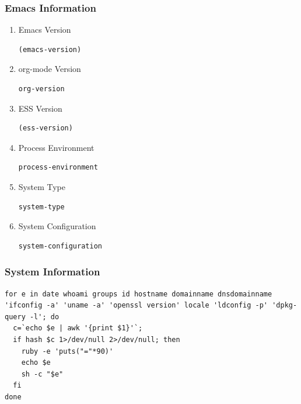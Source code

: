 \documentclass[11pt]{article}
\begin{document}
\subsubsection{Emacs Information}
\label{sec-9-2-4}

\begin{enumerate}
\item Emacs Version
\label{sec-9-2-4-1}

\begin{verbatim}
(emacs-version)
\end{verbatim}

\item org-mode Version
\label{sec-9-2-4-2}

\begin{verbatim}
org-version
\end{verbatim}

\item ESS Version
\label{sec-9-2-4-3}

\begin{verbatim}
(ess-version)
\end{verbatim}

\item Process Environment
\label{sec-9-2-4-4}

\begin{verbatim}
process-environment
\end{verbatim}

\item System Type
\label{sec-9-2-4-5}

\begin{verbatim}
system-type
\end{verbatim}

\item System Configuration
\label{sec-9-2-4-6}

\begin{verbatim}
system-configuration
\end{verbatim}
\end{enumerate}

\subsubsection{System Information}
\label{sec-9-2-5}

\begin{verbatim}
for e in date whoami groups id hostname domainname dnsdomainname 'ifconfig -a' 'uname -a' 'openssl version' locale 'ldconfig -p' 'dpkg-query -l'; do
  c=`echo $e | awk '{print $1}'`;
  if hash $c 1>/dev/null 2>/dev/null; then 
    ruby -e 'puts("="*90)'
    echo $e
    sh -c "$e"
  fi
done
\end{verbatim}
\end{document}
